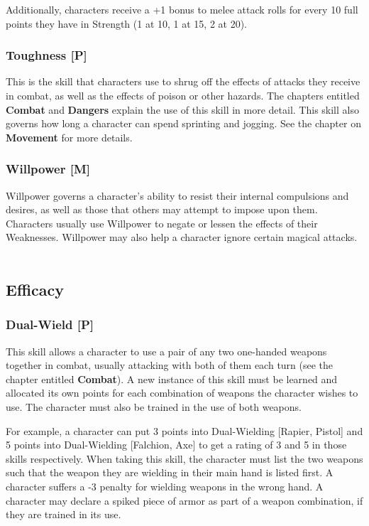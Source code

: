\documentclass[oneside]{book}
\begin{document}
\begin{multicols}{2}
Additionally, characters receive a +1 bonus to melee attack rolls for every 10 full points they have in Strength (1 at 10, 1 at 15, 2 at 20).

\subsubsection{Toughness [P]}
This is the skill that characters use to shrug off the effects of attacks they receive in combat, as well as the effects of poison or other hazards. The chapters entitled \textbf{Combat} and \textbf{Dangers} explain the use of this skill in more detail. This skill also governs how long a character can spend sprinting and jogging. See the chapter on \textbf{Movement} for more details.

\subsubsection{Willpower [M]}
Willpower governs a character's ability to resist their internal compulsions and desires, as well as those that others may attempt to impose upon them. Characters usually use Willpower to negate or lessen the effects of their Weaknesses. Willpower may also help a character ignore certain magical attacks.
\\
\\
\subsection{Efficacy}
\subsubsection{Dual-Wield [P]}
This skill allows a character to use a pair of any two one-handed weapons together in combat, usually attacking with both of them each turn (see the chapter entitled \textbf{Combat}). A new instance of this skill must be learned and allocated its own points for each combination of weapons the character wishes to use. The character must also be trained in the use of both weapons. 

For example, a character can put 3 points into Dual-Wielding [Rapier, Pistol] and 5 points into Dual-Wielding [Falchion, Axe] to get a rating of 3 and 5 in those skills respectively. When taking this skill, the character must list the two weapons such that the weapon they are wielding in their main hand is listed first. A character suffers a -3 penalty for wielding weapons in the wrong hand. A character may declare a spiked piece of armor as part of a weapon combination, if they are trained in its use. 


\end{multicols}
\end{document}
